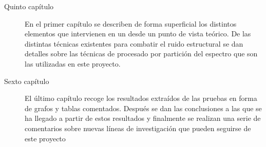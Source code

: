 \begin{description}
	\item[Quinto capítulo] En el primer capítulo se describen de forma
		superficial los distintos elementos que intervienen en un
		 desde un punto de vista teórico. De las
		distintas técnicas existentes para combatir el ruido
		estructural se dan detalles sobre las técnicas de procesado
		por partición del espectro que son las utilizadas en este
		proyecto.
	\item[Sexto capítulo] El último capítulo recoge los resultados
		extraídos de las pruebas en forma de grafos y tablas
		comentados. Después se dan las conclusiones a las que se ha
		llegado a partir de estos resultados y finalmente se
		realizan una serie de comentarios sobre nuevas líneas de
		investigación que pueden seguirse de este proyecto
\end{description}

